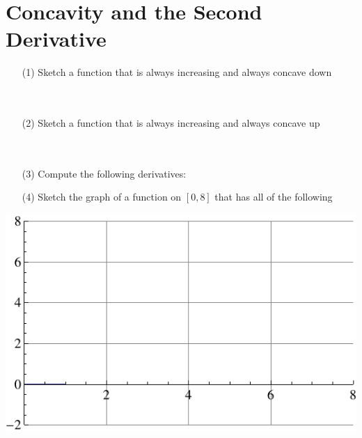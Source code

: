 \documentclass[12pt]{article}
\begin{document}
\section*{Concavity and the Second Derivative}
\begin{itemize}
    \item[(1)] Sketch a function that is always increasing and always concave down \\\\\\
    \item[(2)] Sketch a function that is always increasing and always concave up \\\\\\
    \item[(3)] Compute the following derivatives:
    \begin{itemize}
    \end{itemize}
    \vspace{1.5in}
    \item[(4)] Sketch the graph of a function on $[0,8]$ that has all of the following
    \begin{itemize}
    \end{itemize}
    \end{itemize}
    \vspace{.25in}
    \begin{center}
        \includegraphics[scale=1.75]{grid.pdf}
    \end{center}
\end{document}
